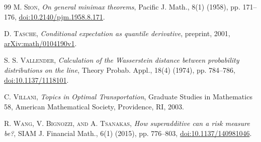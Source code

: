 \begin{thebibliography}{99}
\textsc{M. Sion}, \emph{On general minimax theorems}, Pacific J. Math., 8(1) (1958), pp. 171--176, \href{https://doi.org/10.2140/pjm.1958.8.171}{doi:10.2140/\allowbreak pjm.1958.8.171}.

\textsc{D. Tasche}, \emph{Conditional expectation as quantile derivative}, preprint, 2001, \href{https://arxiv.org/abs/math/0104190v1}{arXiv:math/0104190v1}.

\textsc{S. S. Vallender}, \emph{Calculation of the Wasserstein distance between probability distributions on the line}, Theory Probab. Appl., 18(4) (1974), pp. 784--786, \href{https://doi.org/10.1137/1118101}{doi:10.1137/1118101}.

\textsc{C. Villani}, \emph{Topics in Optimal Transportation}, Graduate Studies in Mathematics 58, American Mathematical Society, Providence, RI, 2003.

\textsc{R. Wang, V. Bignozzi, and A. Tsanakas}, \emph{How superadditive can a risk measure be?}, SIAM J. Financial Math., 6(1) (2015), pp. 776--803, \href{https://doi.org/10.1137/140981046}{doi:10.1137/140981046}.

\end{thebibliography}
